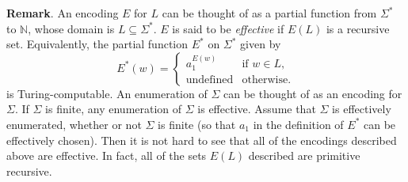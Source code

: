 \documentclass[12pt]{article}
\begin{document}
\textbf{Remark}.  An encoding $E$ for $L$ can be thought of as a partial function from $\Sigma^*$ to $\mathbb{N}$, whose domain is $L\subseteq \Sigma^*$.  $E$ is said to be \emph{effective} if $E(L)$ is a recursive set.  Equivalently, the partial function $E^*$ on $\Sigma^*$ given by
\begin{displaymath}
E^*(w) = \left\{
\begin{array}{ll}
a_1^{E(w)} & \textrm{if } w\in L, \\
\textrm{undefined} & \textrm{otherwise}.
\end{array}
\right.
\end{displaymath}
is Turing-computable.  An enumeration of $\Sigma$ can be thought of as an encoding for $\Sigma$.  If $\Sigma$ is finite, any enumeration of $\Sigma$ is effective.  Assume that $\Sigma$ is effectively enumerated, whether or not $\Sigma$ is finite (so that $a_1$ in the definition of $E^*$ can be effectively chosen).  Then it is not hard to see that all of the encodings described above are effective.  In fact, all of the sets $E(L)$ described are primitive recursive.
\end{document}
